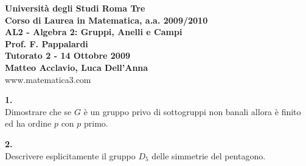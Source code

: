 \documentclass[italian,a4paper,11pt]
{article}
\newcommand{\acc}{\`}
\begin{document}
\begin{center}

\textbf{Universit\`a degli Studi Roma Tre}\\

\textbf{Corso di Laurea in Matematica, a.a. 2009/2010}\\

\textbf{AL2 - Algebra 2: Gruppi, Anelli e Campi}\\

\textbf{Prof. F. Pappalardi}\\

\textbf{Tutorato 2 - 14 Ottobre 2009}\\

\textbf{Matteo Acclavio, Luca Dell'Anna}\\

www.matematica3.com\\
\end{center}



\vspace{0.4cm}


\noindent
\begin{Ex}\textbf{ 1.}\\
Dimostrare che se $G$ \acc e un gruppo privo di sottogruppi non banali allora \acc e finito ed ha ordine $p$ con $p$ primo.
\end{Ex}

\vspace{0.4cm}
\noindent
\begin{Ex}\textbf{ 2.}\\
Descrivere esplicitamente il gruppo $D_5$ delle simmetrie del pentagono.
\end{Ex}
\end{document}

